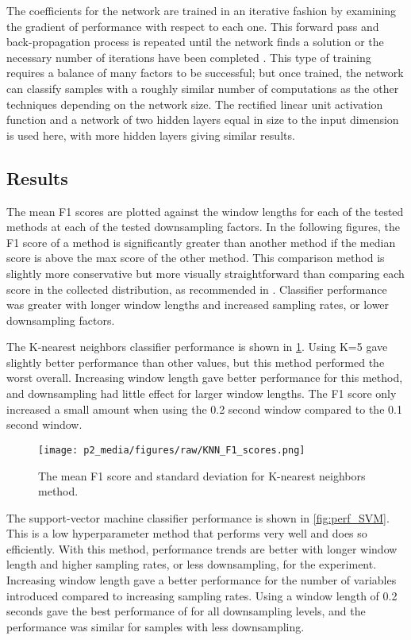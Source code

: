 The coefficients for the network are trained in an iterative fashion by examining 
the gradient of performance with respect to each one.
This forward pass and back-propagation process is repeated until the network finds 
a solution or the necessary number of iterations have been completed \cite{maxwell2017deep}.
This type of training requires a balance of many factors to be successful; but once trained,
the network can classify samples with a roughly similar number of computations as the other
techniques depending on the network size.
The rectified linear unit activation function and a network of two hidden layers 
equal in size to the input dimension is used here, with more hidden layers giving similar results.

\subsection{Results}

The mean F1 scores are plotted against the window lengths for each of the tested methods 
at each of the tested downsampling factors.
In the following figures, the F1 score of a method is significantly greater than another method
if the median score is above the max score of the other method.
This comparison method is slightly more conservative but more visually straightforward
than comparing each score in the collected distribution,
as recommended in \cite{Goutte2005}.
Classifier performance was greater with longer window lengths and 
increased sampling rates, or lower downsampling factors.

The K-nearest neighbors classifier performance is shown in \ref{fig:perf_KNN}.
Using K=5 gave slightly better performance than other values, 
but this method performed the worst overall.
Increasing window length gave better performance for this method, and downsampling had little effect
for larger window lengths. 
The F1 score only increased a small amount when using the 0.2 second window compared to the 0.1 second window.

\begin{figure}[h]
\centering
\texttt{[image: p2\_media/figures/raw/KNN\_F1\_scores.png]}
\caption{The mean F1 score and standard deviation for K-nearest neighbors method. 
}
\label{fig:perf_KNN}
\end{figure}

The support-vector machine classifier performance is shown in \ref{fig:perf_SVM}.
This is a low hyperparameter method that performs very well and does so efficiently. 
With this method, performance trends are better with longer window length and higher sampling rates, 
or less downsampling, for the experiment. Increasing window length gave a better performance for 
the number of variables introduced compared to increasing sampling rates. 
Using a window length of 0.2 seconds gave the best performance of for all downsampling levels, 
and the performance was similar for samples with less downsampling.

